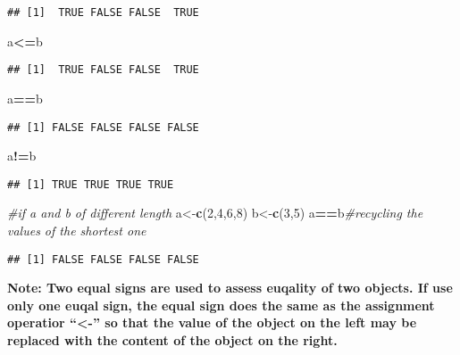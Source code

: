 \documentclass[]{book}
\newenvironment{Shaded}{\begin{snugshade}}{\end{snugshade}}
\newcommand{\KeywordTok}[1]{\textcolor[rgb]{0.13,0.29,0.53}{\textbf{#1}}}
\newcommand{\DecValTok}[1]{\textcolor[rgb]{0.00,0.00,0.81}{#1}}
\newcommand{\CommentTok}[1]{\textcolor[rgb]{0.56,0.35,0.01}{\textit{#1}}}
\newcommand{\OperatorTok}[1]{\textcolor[rgb]{0.81,0.36,0.00}{\textbf{#1}}}
\newcommand{\NormalTok}[1]{#1}
\theoremstyle{definition}
\theoremstyle{definition}
\theoremstyle{definition}
\theoremstyle{remark}
\begin{document}
\begin{verbatim}
## [1]  TRUE FALSE FALSE  TRUE
\end{verbatim}

\begin{Shaded}
\begin{Highlighting}[]
\NormalTok{a}\OperatorTok{<=}\NormalTok{b}
\end{Highlighting}
\end{Shaded}

\begin{verbatim}
## [1]  TRUE FALSE FALSE  TRUE
\end{verbatim}

\begin{Shaded}
\begin{Highlighting}[]
\NormalTok{a}\OperatorTok{==}\NormalTok{b}
\end{Highlighting}
\end{Shaded}

\begin{verbatim}
## [1] FALSE FALSE FALSE FALSE
\end{verbatim}

\begin{Shaded}
\begin{Highlighting}[]
\NormalTok{a}\OperatorTok{!=}\NormalTok{b}
\end{Highlighting}
\end{Shaded}

\begin{verbatim}
## [1] TRUE TRUE TRUE TRUE
\end{verbatim}

\begin{Shaded}
\begin{Highlighting}[]
\CommentTok{#if a and b of different length}
\NormalTok{a<-}\KeywordTok{c}\NormalTok{(}\DecValTok{2}\NormalTok{,}\DecValTok{4}\NormalTok{,}\DecValTok{6}\NormalTok{,}\DecValTok{8}\NormalTok{)}
\NormalTok{b<-}\KeywordTok{c}\NormalTok{(}\DecValTok{3}\NormalTok{,}\DecValTok{5}\NormalTok{)}
\NormalTok{a}\OperatorTok{==}\NormalTok{b}\CommentTok{#recycling the values of the shortest one}
\end{Highlighting}
\end{Shaded}

\begin{verbatim}
## [1] FALSE FALSE FALSE FALSE
\end{verbatim}

\textbf{Note: Two equal signs are used to assess euqality of two
objects. If use only one euqal sign, the equal sign does the same as the
assignment operatior ``\textless{}-'' so that the value of the object on
the left may be replaced with the content of the object on the right.}
\end{document}
